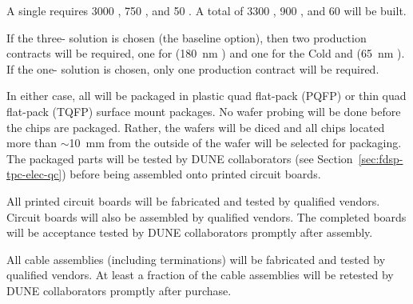 A single  requires \num{3000} , \num{750} , and \num{50} .  A total of \num{3300} , \num{900} , and \num{60}  will be built.

If the three-  solution is chosen (the baseline option), then two  production contracts will be required, one for  (\SI{180}{nm} ) and one for the Cold  and  (\SI{65}{nm} ).  If the one-  solution is chosen, only one  production contract will be required.

In either case, all  will be packaged in plastic quad flat-pack (PQFP) or thin quad flat-pack (TQFP) surface mount packages.  No wafer probing will be done before the chips are packaged.  Rather, the wafers will be diced and all chips located more than $\sim$\SI{10}{mm} from the outside of the wafer will be selected for packaging.  The packaged parts will be tested by DUNE collaborators (see Section~\ref{sec:fdsp-tpc-elec-qc}) before being assembled onto printed circuit boards.

All printed circuit boards will be fabricated and tested by qualified vendors. Circuit boards will also be assembled by qualified vendors.  The completed boards will be acceptance tested by DUNE collaborators promptly after assembly.

All cable assemblies (including terminations) will be fabricated and tested by qualified vendors.  At least a fraction of the cable assemblies will be retested by DUNE collaborators promptly after purchase.

